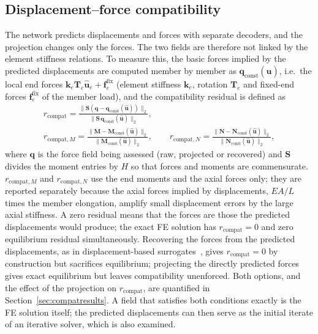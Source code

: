 \subsection{Displacement--force compatibility}\label{sec:compat}
The network predicts displacements and forces with separate decoders, and the projection changes only the forces. The two fields are therefore not linked by the element stiffness relations. To measure this, the basic forces implied by the predicted displacements are computed member by member as $\mathbf{q}_\mathrm{const}(\hat{\mathbf{u}})$, i.e.\ the local end forces $\mathbf{k}_e\mathbf{T}_e\hat{\mathbf{u}}_e + \mathbf{f}^\mathrm{fix}_e$ (element stiffness $\mathbf{k}_e$, rotation $\mathbf{T}_e$ and fixed-end forces $\mathbf{f}^\mathrm{fix}_e$ of the member load), and the compatibility residual is defined as
\begin{equation}\label{eq:compat}
\begin{gathered}
r_\mathrm{compat} = \frac{\|\mathbf{S}(\mathbf{q}-\mathbf{q}_\mathrm{const}(\hat{\mathbf{u}}))\|_2}{\|\mathbf{S}\,\mathbf{q}_\mathrm{const}(\hat{\mathbf{u}})\|_2},\\
r_{\mathrm{compat},M} = \frac{\|\mathbf{M}-\mathbf{M}_\mathrm{const}(\hat{\mathbf{u}})\|_2}{\|\mathbf{M}_\mathrm{const}(\hat{\mathbf{u}})\|_2},
\qquad r_{\mathrm{compat},N} = \frac{\|\mathbf{N}-\mathbf{N}_\mathrm{const}(\hat{\mathbf{u}})\|_2}{\|\mathbf{N}_\mathrm{const}(\hat{\mathbf{u}})\|_2},
\end{gathered}
\end{equation}
where $\mathbf{q}$ is the force field being assessed (raw, projected or recovered) and $\mathbf{S}$ divides the moment entries by $H$ so that forces and moments are commensurate. $r_{\mathrm{compat},M}$ and $r_{\mathrm{compat},N}$ use the end moments and the axial forces only; they are reported separately because the axial forces implied by displacements, $EA/L$ times the member elongation, amplify small displacement errors by the large axial stiffness. A zero residual means that the forces are those the predicted displacements would produce; the exact FE solution has $r_\mathrm{compat}=0$ and zero equilibrium residual simultaneously. Recovering the forces from the predicted displacements, as in displacement-based surrogates~\cite{leng2026mcgnn}, gives $r_\mathrm{compat}=0$ by construction but sacrifices equilibrium; projecting the directly predicted forces gives exact equilibrium but leaves compatibility unenforced. Both options, and the effect of the projection on $r_\mathrm{compat}$, are quantified in Section~\ref{sec:compatresults}. A field that satisfies both conditions exactly is the FE solution itself; the predicted displacements can then serve as the initial iterate of an iterative solver, which is also examined.

